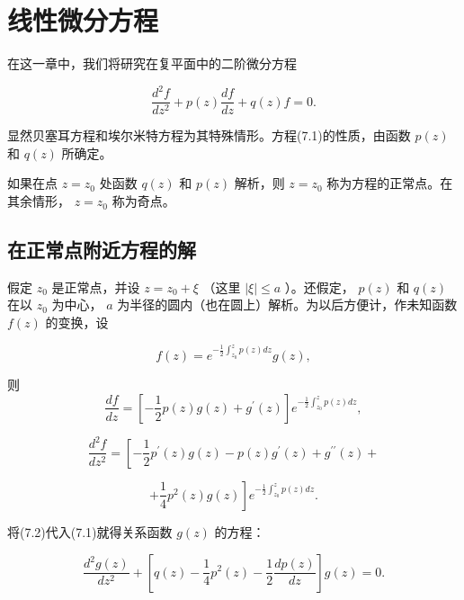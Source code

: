 \chapter{线性微分方程}

在这一章中，我们将研究在复平面中的二阶微分方程

\begin{equation*}
\frac {d ^ {2} f}{d z ^ {2}} + p (z) \frac {d f}{d z} + q (z) f = 0.\tag{7.1}
\end{equation*}

显然贝塞耳方程和埃尔米特方程为其特殊情形。方程(7.1)的性质，由函数 $p(z)$ 和 $q(z)$ 所确定。

如果在点 $z = z_0$ 处函数 $q(z)$ 和 $p(z)$ 解析，则 $z = z_0$ 称为方程的正常点。在其余情形， $z = z_0$ 称为奇点。

\section{在正常点附近方程的解}

假定 $z_0$ 是正常点，并设 $z = z_0 + \xi$ （这里 $|\xi| \leqslant a$ ）。还假定， $p(z)$ 和 $q(z)$ 在以 $z_0$ 为中心， $a$ 为半径的圆内（也在圆上）解析。为以后方便计，作未知函数 $f(z)$ 的变换，设

\begin{equation*}
f (z) = e ^ {- \frac {1}{2} \int_ {z _ {0}} ^ {z} p (z) d z} g (z),
\end{equation*}

则
\begin{equation*}
\frac {d f}{d z} = \left[ - \frac {1}{2} p (z) g (z) + g ^ {\prime} (z) \right] e ^ {- \frac {1}{2} \int_ {z _ {0}} ^ {z} p (z) d z},
\end{equation*}

\begin{equation*}
\frac {d ^ {2} f}{d z ^ {2}} = \left[ - \frac {1}{2} p ^ {\prime} (z) g (z) - p (z) g ^ {\prime} (z) + g ^ {\prime \prime} (z) + \right.
\end{equation*}

\begin{equation*}
\left. + \frac {1}{4} p ^ {2} (z) g (z) \right] e ^ {- \frac {1}{2} \int_ {z _ {0}} ^ {z} p (z) d z}.\tag{7.2}
\end{equation*}

将(7.2)代入(7.1)就得关系函数 $g(z)$ 的方程：

\begin{equation*}
\frac {d ^ {2} g (z)}{d z ^ {2}} + \left[ q (z) - \frac {1}{4} p ^ {2} (z) - \frac {1}{2} \frac {d p (z)}{d z} \right] g (z) = 0.\tag{7.3}
\end{equation*}

